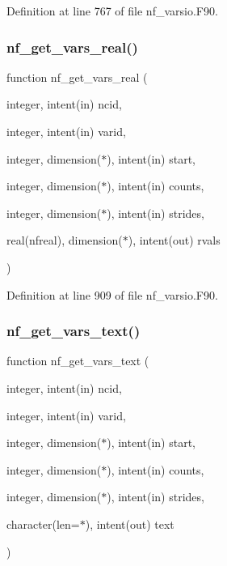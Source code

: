 Definition at line 767 of file nf\+\_\+varsio.\+F90.

\mbox{\label{nf__varsio_8F90_ada6429f71e07e9d429b32f458dbfebf1}} 
\subsubsection{\texorpdfstring{nf\+\_\+get\+\_\+vars\+\_\+real()}{nf\_get\_vars\_real()}}
{\footnotesize\ttfamily function nf\+\_\+get\+\_\+vars\+\_\+real (\begin{DoxyParamCaption}\item[{integer, intent(in)}]{ncid,  }\item[{integer, intent(in)}]{varid,  }\item[{integer, dimension($\ast$), intent(in)}]{start,  }\item[{integer, dimension($\ast$), intent(in)}]{counts,  }\item[{integer, dimension($\ast$), intent(in)}]{strides,  }\item[{real(nfreal), dimension($\ast$), intent(out)}]{rvals }\end{DoxyParamCaption})}



Definition at line 909 of file nf\+\_\+varsio.\+F90.

\mbox{\label{nf__varsio_8F90_a9a8e9e291559bb6aa380d5f01f74075f}} 
\subsubsection{\texorpdfstring{nf\+\_\+get\+\_\+vars\+\_\+text()}{nf\_get\_vars\_text()}}
{\footnotesize\ttfamily function nf\+\_\+get\+\_\+vars\+\_\+text (\begin{DoxyParamCaption}\item[{integer, intent(in)}]{ncid,  }\item[{integer, intent(in)}]{varid,  }\item[{integer, dimension($\ast$), intent(in)}]{start,  }\item[{integer, dimension($\ast$), intent(in)}]{counts,  }\item[{integer, dimension($\ast$), intent(in)}]{strides,  }\item[{character(len=$\ast$), intent(out)}]{text }\end{DoxyParamCaption})}



